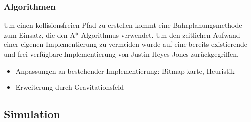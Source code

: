 \subsubsection{Algorithmen}
\authorsection{\editorjulian}

Um einen kollisionsfreien Pfad zu erstellen kommt eine Bahnplanungsmethode zum Einsatz, die den A*-Algorithmus verwendet. Um den zeitlichen Aufwand einer eigenen Implementierung zu vermeiden wurde auf eine bereits existierende und frei verfügbare Implementierung von Justin Heyes-Jones zurückgegriffen.


\begin{itemize}
		\item Anpassungen an bestehender Implementierung: Bitmap karte, Heuristik
		\item Erweiterung durch Gravitationsfeld
\end{itemize}

\subsection{Simulation}
\label{simulation_subsec}
\authorsection{\editoroier}
